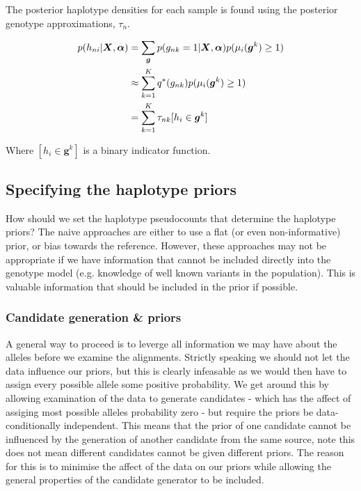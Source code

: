 \documentclass{article}
\begin{document}
The posterior haplotype densities for each sample is found using the posterior genotype approximations, $\tau_{n}$.

\begin{align}
\label{eq:sh_pp}
p(h_{ni} | \boldsymbol{X}, \boldsymbol{\alpha}) &= \sum_{\boldsymbol{g}} p(g_{nk} = 1 | \boldsymbol{X}, \boldsymbol{\alpha}) p(\mu_i(\boldsymbol{g}^k) \ge 1) \notag \\
    &\approx \sum_{k = 1}^K q^*(g_{nk}) p(\mu_i(\boldsymbol{g}^k) \ge 1) \notag \\
    &= \sum_{k = 1}^K \tau_{nk} [h_i \in \boldsymbol{g}^k]
\end{align}

Where $[h_i \in \boldsymbol{g}^k]$ is a binary indicator function.

\subsection{Specifying the haplotype priors}

How should we set the haplotype pseudocounts that determine the haplotype priors? The naive approaches are either to use a flat (or even non-informative) prior, or bias towards the reference. However, these approaches may not be appropriate if we have information that cannot be included directly into the genotype model (e.g. knowledge of well known variants in the population). This is valuable information that should be included in the prior if possible.

\subsubsection{Candidate generation \& priors}

A general way to proceed is to leverge all information we may have about the alleles before we examine the alignments. Strictly speaking we should not let the data influence our priors, but this is clearly infeasable as we would then have to assign every possible allele some positive probability. We get around this by allowing examination of the data to generate candidates - which has the affect of assiging most possible alleles probability zero - but require the priors be data-conditionally independent. This means that the prior of one candidate cannot be influenced by the generation of another candidate from the same source, note this does not mean different candidates cannot be given different priors. The reason for this is to minimise the affect of the data on our priors while allowing the general properties of the candidate generator to be included.
\end{document}
